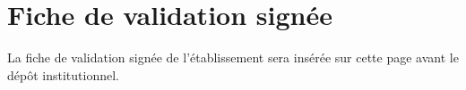 \chapter*{Fiche de validation signée}

\vspace{1cm}

\noindent La fiche de validation signée de l'établissement sera insérée sur
cette page avant le dépôt institutionnel.

\vfill

